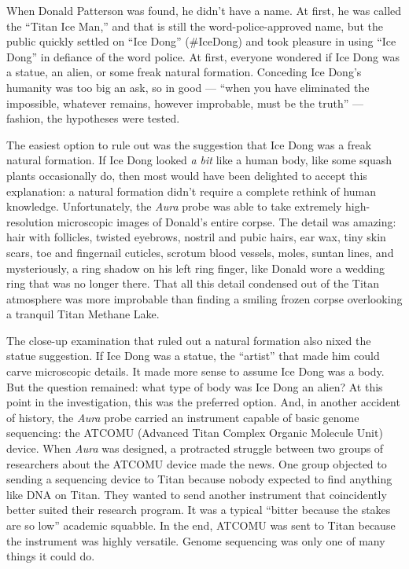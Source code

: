When Donald Patterson was found, he didn't have a name. At first, he was
called the ``Titan Ice Man,'' and that is still the word-police-approved
name, but the public quickly settled on ``Ice Dong'' (\#IceDong) and
took pleasure in using ``Ice Dong'' in defiance of the word police. At
first, everyone wondered if Ice Dong was a statue, an alien, or some
freak natural formation. Conceding Ice Dong's humanity was too big an
ask, so in good --- ``when you have eliminated the impossible, whatever
remains, however improbable, must be the truth'' --- fashion, the
hypotheses were tested.

The easiest option to rule out was the suggestion that Ice Dong was a
freak natural formation. If Ice Dong looked \emph{a bit} like a human
body, like some squash plants occasionally do, then most would have been
delighted to accept this explanation: a natural formation didn't require
a complete rethink of human knowledge. Unfortunately, the \emph{Aura}
probe was able to take extremely high-resolution microscopic images of
Donald's entire corpse. The detail was amazing: hair with follicles,
twisted eyebrows, nostril and pubic hairs, ear wax, tiny skin scars, toe
and fingernail cuticles, scrotum blood vessels, moles, suntan lines, and
mysteriously, a ring shadow on his left ring finger, like Donald wore a
wedding ring that was no longer there. That all this detail condensed
out of the Titan atmosphere was more improbable than finding a smiling
frozen corpse overlooking a tranquil Titan Methane Lake.

The close-up examination that ruled out a natural formation also nixed
the statue suggestion. If Ice Dong was a statue, the ``artist'' that
made him could carve microscopic details. It made more sense to assume
Ice Dong was a body. But the question remained: what type of body was
Ice Dong an alien? At this point in the investigation, this was the
preferred option. And, in another accident of history, the \emph{Aura}
probe carried an instrument capable of basic genome sequencing: the
ATCOMU (Advanced Titan Complex Organic Molecule Unit) device. When
\emph{Aura} was designed, a protracted struggle between two groups of
researchers about the ATCOMU device made the news. One group objected to
sending a sequencing device to Titan because nobody expected to find
anything like DNA on Titan. They wanted to send another instrument that
coincidently better suited their research program. It was a typical
``bitter because the stakes are so low'' academic squabble. In the end,
ATCOMU was sent to Titan because the instrument was highly versatile.
Genome sequencing was only one of many things it could do.

